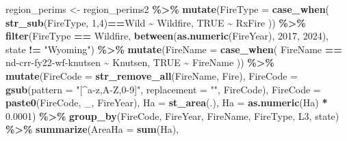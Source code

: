 \documentclass[
]{article}
\newenvironment{Shaded}{\begin{snugshade}}{\end{snugshade}}
\newcommand{\AttributeTok}[1]{\textcolor[rgb]{0.13,0.29,0.53}{#1}}
\newcommand{\ConstantTok}[1]{\textcolor[rgb]{0.56,0.35,0.01}{#1}}
\newcommand{\DecValTok}[1]{\textcolor[rgb]{0.00,0.00,0.81}{#1}}
\newcommand{\FloatTok}[1]{\textcolor[rgb]{0.00,0.00,0.81}{#1}}
\newcommand{\FunctionTok}[1]{\textcolor[rgb]{0.13,0.29,0.53}{\textbf{#1}}}
\newcommand{\NormalTok}[1]{#1}
\newcommand{\OtherTok}[1]{\textcolor[rgb]{0.56,0.35,0.01}{#1}}
\newcommand{\SpecialCharTok}[1]{\textcolor[rgb]{0.81,0.36,0.00}{\textbf{#1}}}
\newcommand{\StringTok}[1]{\textcolor[rgb]{0.31,0.60,0.02}{#1}}
\begin{document}
\begin{Shaded}
\begin{Highlighting}[]
\NormalTok{region\_perims }\OtherTok{\textless{}{-}} 
\NormalTok{  region\_perims2  }\SpecialCharTok{\%\textgreater{}\%}
  \FunctionTok{mutate}\NormalTok{(}\AttributeTok{FireType =} \FunctionTok{case\_when}\NormalTok{(}
          \FunctionTok{str\_sub}\NormalTok{(FireType, }\DecValTok{1}\NormalTok{,}\DecValTok{4}\NormalTok{)}\SpecialCharTok{==}\StringTok{\textquotesingle{}Wild\textquotesingle{}} \SpecialCharTok{\textasciitilde{}} \StringTok{\textquotesingle{}Wildfire\textquotesingle{}}\NormalTok{, }
          \ConstantTok{TRUE} \SpecialCharTok{\textasciitilde{}} \StringTok{\textquotesingle{}RxFire\textquotesingle{}}\NormalTok{ )) }\SpecialCharTok{\%\textgreater{}\%}
  \FunctionTok{filter}\NormalTok{(FireType }\SpecialCharTok{==} \StringTok{\textquotesingle{}Wildfire\textquotesingle{}}\NormalTok{, }
         \FunctionTok{between}\NormalTok{(}\FunctionTok{as.numeric}\NormalTok{(FireYear), }\DecValTok{2017}\NormalTok{, }\DecValTok{2024}\NormalTok{), }
\NormalTok{         state }\SpecialCharTok{!=} \StringTok{"Wyoming"}\NormalTok{) }\SpecialCharTok{\%\textgreater{}\%}
  \FunctionTok{mutate}\NormalTok{(}\AttributeTok{FireName =} \FunctionTok{case\_when}\NormalTok{(}
\NormalTok{              FireName }\SpecialCharTok{==} \StringTok{\textquotesingle{}nd{-}crr{-}fy22{-}wf{-}knutsen\textquotesingle{}} \SpecialCharTok{\textasciitilde{}} \StringTok{\textquotesingle{}Knutsen\textquotesingle{}}\NormalTok{, }
              \ConstantTok{TRUE} \SpecialCharTok{\textasciitilde{}}\NormalTok{ FireName )) }\SpecialCharTok{\%\textgreater{}\%}
  \FunctionTok{mutate}\NormalTok{(}\AttributeTok{FireCode =} \FunctionTok{str\_remove\_all}\NormalTok{(FireName, }\StringTok{\textquotesingle{} Fire\textquotesingle{}}\NormalTok{), }
         \AttributeTok{FireCode =} \FunctionTok{gsub}\NormalTok{(}\AttributeTok{pattern     =} \StringTok{"[\^{}a{-}z,A{-}Z,0{-}9]"}\NormalTok{, }
                         \AttributeTok{replacement =} \StringTok{""}\NormalTok{, }
\NormalTok{                         FireCode), }
         \AttributeTok{FireCode =} \FunctionTok{paste0}\NormalTok{(FireCode, }\StringTok{\textquotesingle{}\_\textquotesingle{}}\NormalTok{, FireYear), }
         \AttributeTok{Ha =} \FunctionTok{st\_area}\NormalTok{(.), }
         \AttributeTok{Ha =} \FunctionTok{as.numeric}\NormalTok{(Ha) }\SpecialCharTok{*} \FloatTok{0.0001}\NormalTok{) }\SpecialCharTok{\%\textgreater{}\%}
  \FunctionTok{group\_by}\NormalTok{(FireCode, FireYear, FireName, FireType, L3, state) }\SpecialCharTok{\%\textgreater{}\%}
  \FunctionTok{summarize}\NormalTok{(}\AttributeTok{AreaHa =} \FunctionTok{sum}\NormalTok{(Ha), }

\end{Highlighting}
\end{Shaded}
\end{document}
